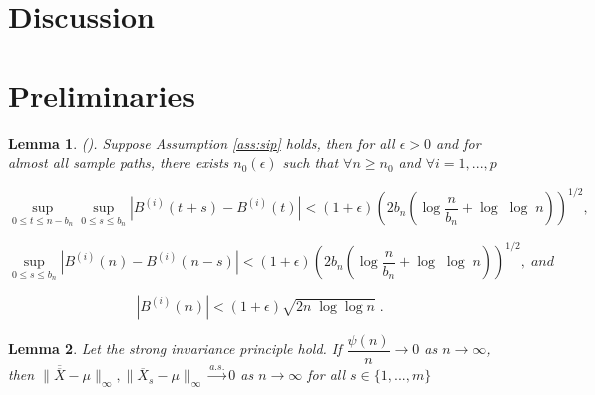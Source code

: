 \documentclass[12pt]{article}
\newtheorem{lemma}{Lemma}
\begin{document}
\section{Discussion} \label{sec:discussion}


\appendix

\section{Preliminaries} \label{apdx:preliminaries}

\begin{lemma}
\label{lemma: brownian}
(\cite{csorgo2014strong}). Suppose Assumption \ref{ass:sip} holds, then for all $\epsilon > 0$ and for almost all sample paths, there exists $n_{0}\left(\epsilon\right)$ such that $\forall n\geq n_{0}$ and $\forall i = 1, ..., p$

\[
\sup_{0\leq t \leq n-b_n}\sup_{0 \leq s \leq b_n} \left| B^{\left(i\right)}\left(t+s\right) - B^{\left(i\right)}\left(t\right) \right| < \left(1+ \epsilon\right)\left(2b_n\left(\log\dfrac{n}{b_n} + \log\; \log\; n\right)\right)^{1/2} ,
\]

\[
\sup_{0 \leq s \leq b_n} \left|B^{\left(i\right)}\left(n\right) - B^{\left(i\right)}\left(n - s\right)\right| < \left(1+ \epsilon\right)\left(2b_n\left(\log\dfrac{n}{b_n} + \log\;\log\;n\right)\right)^{1/2} , \;and
\]

\[
\left|B^{\left(i\right)}\left(n\right)\right| < \left(1+\epsilon\right)\sqrt{2n\;\log \log n} \; . 
\]
\end{lemma}

\bigskip

\begin{lemma} \label{lemma:consis_1}
  Let the strong invariance principle hold. If $\dfrac{\psi(n)}{n} \to 0$ as $n \to \infty$, then $\|\overline\overline{{X}} - \mu\|_{\infty}, \|\overline{X}_s - \mu\|_{\infty} \xrightarrow[]{a.s.} 0$ as $n \to \infty$ for all $s \in \{1,..., m\}$\\
  \end{lemma}
\end{document}
